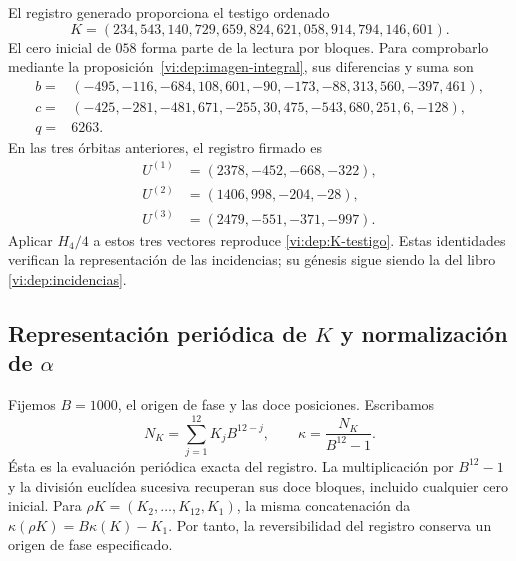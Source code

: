 El registro generado proporciona el testigo ordenado
\begin{equation}
 K=(234,543,140,729,659,824,621,058,914,794,146,601).
 \label{vi:dep:K-testigo}
\end{equation}
El cero inicial de \(058\) forma parte de la lectura por bloques.
Para comprobarlo mediante la proposición~\ref{vi:dep:imagen-integral}, sus diferencias
y suma son
\[
\begin{split}
b={}&(-495,-116,-684,108,601,-90,-173,-88,313,560,-397,461),\\
c={}&(-425,-281,-481,671,-255,30,475,-543,680,251,6,-128),\\
q={}&6263.
\end{split}
\]
En las tres órbitas anteriores, el registro firmado es
\[
 \begin{aligned}
 U^{(1)}&=(2378,-452,-668,-322),\\
 U^{(2)}&=(1406,998,-204,-28),\\
 U^{(3)}&=(2479,-551,-371,-997).
 \end{aligned}
\]
Aplicar \(H_4/4\) a estos tres vectores reproduce
\eqref{vi:dep:K-testigo}. Estas identidades verifican la representación de
las incidencias; su génesis sigue siendo la del libro
\eqref{vi:dep:incidencias}.

\subsection{\texorpdfstring{Representación periódica de \(K\) y normalización de \(\alpha\)}{Representación periódica de K y normalización de alfa}}
\label{vi:dep:alpha}

Fijemos \(B=1000\), el origen de fase y las doce posiciones. Escribamos
\[
 N_K=\sum_{j=1}^{12}K_jB^{12-j},\qquad
 \kappa=\frac{N_K}{B^{12}-1}.
\]
Ésta es la evaluación periódica exacta del registro. La multiplicación
por \(B^{12}-1\) y la división euclídea sucesiva recuperan sus doce
bloques, incluido cualquier cero inicial. Para
\(\rho K=(K_2,\ldots,K_{12},K_1)\), la misma concatenación da
\(\kappa(\rho K)=B\kappa(K)-K_1\). Por tanto, la reversibilidad
del registro conserva un origen de fase especificado.

